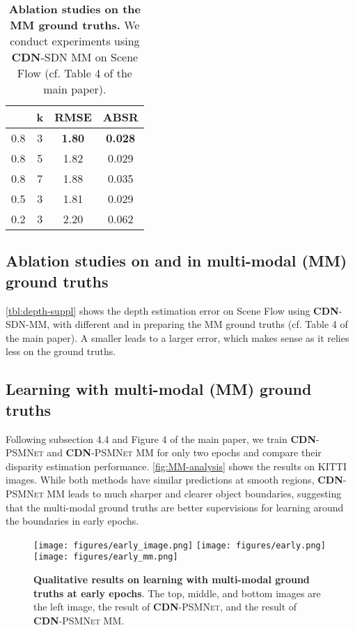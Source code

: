 \documentclass{article}
\newcommand{\method}[1]{\textsc{#1}}
\newcommand{\SDN}{\method{SDN}\xspace}
\newcommand{\PSMNet}{\method{PSMNet}\xspace}
\newcommand{\CDN}{\textbf{\method{CDN}}\xspace}
\begin{document}
\begin{table}[t]
    \centering
	\caption{ \small \textbf{Ablation studies on the MM ground truths.} We conduct experiments using \CDN-\SDN MM on Scene Flow (cf. Table 4 of the main paper).}
    \renewcommand{\arraystretch}{0.3}
	\begin{tabular}{c|c|c|c}
		 & k & RMSE & ABSR \\ \hline
		0.8 & 3  & \textbf{1.80} & \textbf{0.028}  \\
		0.8 & 5  & 1.82 & 0.029  \\
		0.8 & 7  & 1.88 & 0.035  \\
		0.5 & 3  & 1.81 & 0.029  \\
		0.2 & 3  & 2.20 & 0.062   \\
		\hline
	\end{tabular}
	\label{tbl:depth-suppl}
\end{table} 

\subsection{Ablation studies on  and  in multi-modal (MM) ground truths} \autoref{tbl:depth-suppl} shows the depth estimation error on Scene Flow using \CDN-\SDN-MM, with different  and  in preparing the MM ground truths (cf. Table 4 of the main paper). A smaller  leads to a larger error, which makes sense as it relies less on the ground truths.

\subsection{Learning with multi-modal (MM) ground truths}

Following subsection 4.4 and Figure 4 of the main paper, we train \CDN-\PSMNet and \CDN-\PSMNet MM for only two epochs and compare their disparity estimation performance. \autoref{fig:MM-analysis} shows the results on KITTI images. While both methods have similar predictions at smooth regions, \CDN-\PSMNet MM leads to much sharper and clearer object boundaries, suggesting that the multi-modal ground truths are better supervisions for learning around the boundaries in early epochs. 

\begin{figure}
\centering
\texttt{[image: figures/early\_image.png]}
\texttt{[image: figures/early.png]}
\texttt{[image: figures/early\_mm.png]}
\caption{\small \textbf{Qualitative results on learning with multi-modal ground truths at early epochs}. The top, middle, and bottom images are the left image, the result of \CDN-\PSMNet, and the result of \CDN-\PSMNet MM.}
\label{fig:MM-analysis}
\end{figure}
\end{document}
